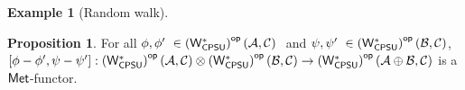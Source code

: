 \documentclass[10pt,a4paper]{amsart}
\theoremstyle{definition}
\theoremstyle{definition}
\newtheorem{example}[definition]{Example}
\theoremstyle{definition}
\theoremstyle{definition}
\newtheorem{proposition}[definition]{Proposition}
\theoremstyle{definition}
\theoremstyle{definition}
\begin{document}
\begin{example}[Random walk]
\begin{comment}
\begin{proof}
  Similarly to  \cite[ Proof of proposition 4.1]{dahlqvist2023syntactic}, in order to prove that $\WstarCPSUop$ is $\catMet$-enriched, it suffices to establish that for normal completely positive subunital maps $\phi: B(\mathcal{H_1}) \rightarrow B(\mathcal{H_2})$  and $\psi: B(\mathcal{K_1}) \rightarrow B(\mathcal{K_2})$, $\cbnorm{\phi \cdot \psi} \leq \phi$ and  $\cbnorm{\phi \cdot \psi} \leq \psi$. This follows directly from Lemma \ref{lem:cb_comp_submult} and the fact that all subunital maps are contractive.
Next, regarding $\bar{\otimes}$, the inequations $\cbnorm{\phi \, \bar{\otimes} \id}  \leq \cbnorm{\phi}$ and  $ \cbnorm{\id \, \bar{\otimes}  \phi} \leq \cbnorm{\phi}$ are  sufficient conditions to prove the second part of the proposition. There inequations follow from Propositions \ref{prop:eqs_id_cb} and \ref{prop:dirsum_cb}.
\end{proof}

\end{comment}



\begin{proposition} \label{prop:cb_cop_functor}
  For all $\phi, \phi' \in \WstarCPSUop(\mathcal{A}, \mathcal{C})  $ and $\psi, \psi' \in \WstarCPSUop(\mathcal{B}, \mathcal{C}) $, $[\phi-\phi',\psi-\psi']:\left(\mathsf{W^*_{CPSU}}\right)^{\mathsf{op}}(\mathcal{A}, \mathcal{C}) \otimes \left(\mathsf{W^*_{CPSU}}\right)^{\mathsf{op}}(\mathcal{B}, \mathcal{C}) \rightarrow \left(\mathsf{W^*_{CPSU}}\right)^{\mathsf{op}}(\mathcal{A} \oplus \mathcal{B}, \mathcal{C}) $ is a $\mathsf{Met}$-functor.
\end{proposition}
  

\end{example}
\end{document}
